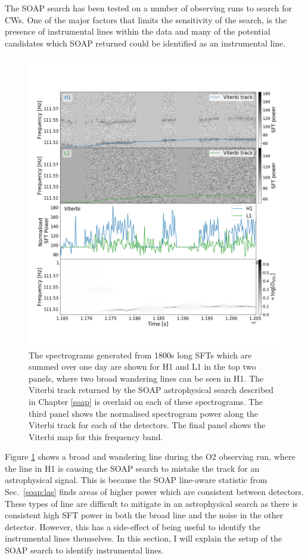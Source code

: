 % 
The SOAP search has been tested on a number of observing runs
to search for \glspl{CW}.  One of the major factors that
limits the sensitivity
of the search, is the presence of instrumental lines within the
data and many of
the potential candidates which SOAP returned could be identified as an
instrumental line.
%
\begin{figure}[hp]
	\includegraphics[width=\textwidth]{C6_detchar/plot_F111_5_wandering_line.png}
        \caption[Broad wandering line example.]{ The spectrograms generated from 1800s long \glspl{SFT} which are summed over one day are shown for H1 and L1 in the top two panels, where two broad wandering lines can be seen in H1.
        The Viterbi track returned by the SOAP astrophysical search described in Chapter \ref{soap} is overlaid on each of these spectrograms.
        The third panel shows the normalised spectrogram power along the Viterbi track for each of the detectors. The final
        panel shows the Viterbi map for this frequency band.
			}
\label{detchar:soap:astrowander}

\end{figure}
%
Figure \ref{detchar:soap:astrowander} shows a broad and wandering line during the O2 observing run, where the line in H1 is causing the SOAP search to mistake the track for an astrophysical signal.
This is because the SOAP line-aware statistic from Sec.~\ref{soap:las} finds
areas of higher power which are consistent between detectors. These types of line are difficult to mitigate in an astrophysical
search as there is consistent high \gls{SFT} power in both the broad line and the noise in the other detector.
However, this has a side-effect of being useful to identify the
instrumental lines themselves.
In this section, I will explain the setup of the SOAP search to identify
instrumental lines.

